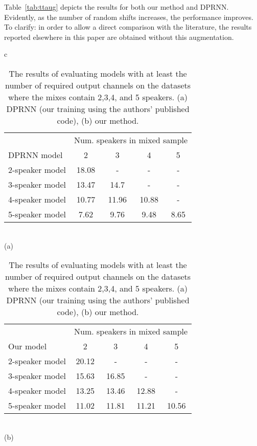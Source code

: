\documentclass{article}
\begin{document}
Table~\ref{tab:ttaug} depicts the results for both our method and DPRNN. Evidently, as the number of random shifts increases, the performance improves. To clarify: in order to allow a direct comparison with the literature, the results reported elsewhere in this paper are obtained without this augmentation.

\begin{table}[t]
    \centering
    \caption{The results of evaluating models with at least the number of required output channels on the datasets where the mixes contain 2,3,4, and 5 speakers. (a) DPRNN (our training using the authors' published code), (b) our method.}
    \label{tab:nummatrix}
    \begin{tabular}{c}
    \begin{tabular}{@{~}lcccc@{~}}
        \toprule
    	& \multicolumn{4}{c}{Num. speakers in mixed sample}\\
    	\cmidrule{2-5}
        DPRNN model	& 2  &	3 &	4 &	5 \\
        \midrule
        2-speaker model&	18.08	& -	& - & -\\
        3-speaker model&	13.47 & 14.7 & -	& -\\
        4-speaker model&	10.77 &	11.96 &	10.88 &	-\\
        5-speaker model&	7.62 &	9.76 &	9.48 &	8.65\\
        \bottomrule
    \end{tabular} \\
    \vspace{0.1cm}
    (a)\\
    \vspace{0.1cm}
    \begin{tabular}{@{~}lcccc@{~}}
        \toprule
    	& \multicolumn{4}{c}{Num. speakers in mixed sample}\\
    	\cmidrule{2-5}
        Our model	& 2  &	3 &	4 &	5 \\
        \midrule
        2-speaker model&	20.12	&-	&-	&-\\
        3-speaker model&	15.63 & 16.85	&-	&-\\
        4-speaker model&	13.25&	13.46 &	12.88&	-\\
        5-speaker model&	11.02&	11.81 &	11.21 &	10.56\\
        \bottomrule
    \end{tabular}\\
    \vspace{0.1cm}
     (b)\\
     \vspace{-0.5cm}
\end{tabular}
\end{table}
\end{document}
